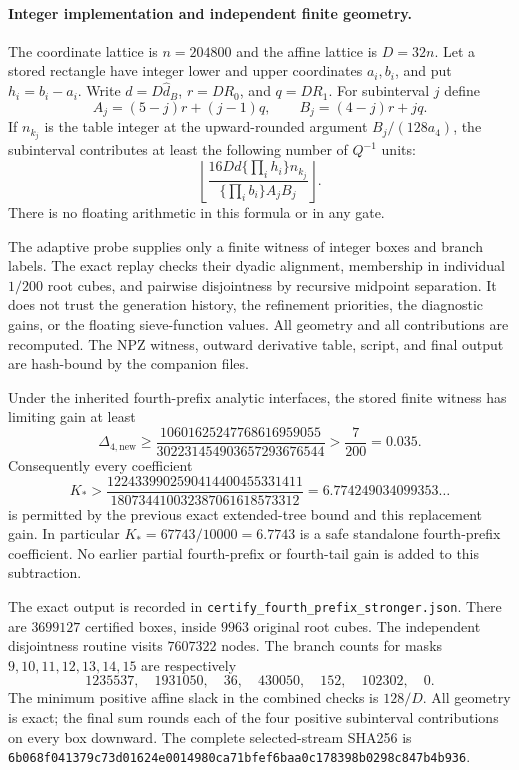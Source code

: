 \paragraph{Integer implementation and independent finite geometry.}
The coordinate lattice is $n=204800$ and the affine lattice is
$D=32n$.  Let a stored rectangle have integer lower and upper
coordinates $a_i,b_i$, and put $h_i=b_i-a_i$.
Write $d=D\widehat d_B$, $r=D R_0$, and $q=D R_1$.
For subinterval $j$ define
\[
 A_j=(5-j)r+(j-1)q,\qquad B_j=(4-j)r+jq.
\]
If $n_{k_j}$ is the table integer at the upward-rounded argument
$B_j/(128a_4)$, the subinterval contributes at least the following
number of $Q^{-1}$ units:
\[
 \left\lfloor
 \frac{16D d\{\prod_i h_i\}n_{k_j}}
      {\{\prod_i b_i\}A_jB_j}
 \right\rfloor.
\]
There is no floating arithmetic in this formula or in any gate.

The adaptive probe supplies only a finite witness of integer boxes
and branch labels.  The exact replay checks their dyadic alignment,
membership in individual $1/200$ root cubes, and pairwise disjointness
by recursive midpoint separation.  It does not trust the generation
history, the refinement priorities, the diagnostic gains, or the
floating sieve-function values.  All geometry and all contributions
are recomputed.  The NPZ witness, outward derivative table, script,
and final output are hash-bound by the companion files.

\begin{proposition}
\label{prop:fourth-prefix-stronger-certificate}
Under the inherited fourth-prefix analytic interfaces, the stored
finite witness has limiting gain at least
\begin{equation}\label{eq:fourth-stronger-exact-gain}
 \Delta_{4,\mathrm{new}}\ge
 \frac{10601625247768616959055}{302231454903657293676544}
 >\frac7{200}=0.035.
\end{equation}
Consequently every coefficient
\[
 K_*>
 \frac{1224339902590414400455331411}
      {180734410032387061618573312}
 =6.774249034099353\ldots
\]
is permitted by the previous exact extended-tree bound and this
replacement gain.  In particular $K_*=67743/10000=6.7743$ is a
safe standalone fourth-prefix coefficient.  No earlier partial
fourth-prefix or fourth-tail gain is added to this subtraction.
\end{proposition}

The exact output is recorded in
\texttt{certify\_fourth\_prefix\_stronger.json}.
There are $3699127$ certified boxes, inside $9963$ original root
cubes.  The independent disjointness routine visits $7607322$ nodes.
The branch counts for masks $9,10,11,12,13,14,15$ are respectively
\[
 1235537,\quad1931050,\quad36,\quad430050,\quad152,\quad102302,\quad0.
\]
The minimum positive affine slack in the combined checks is $128/D$.
All geometry is exact; the final sum rounds each of the four positive
subinterval contributions on every box downward.  The complete
selected-stream SHA256 is
\texttt{6b068f041379c73d01624e0014980ca71bfef6baa0c178398b0298c847b4b936}.

